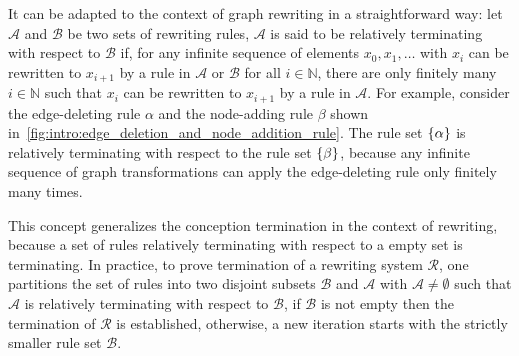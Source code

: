 It can be adapted to the context of graph rewriting in a straightforward way:
let \( \mathcal{A} \) and \( \mathcal{B} \) be two sets of rewriting rules, \( \mathcal{A} \) is said to be relatively terminating with respect to $\mathcal{B}$ if, for any infinite sequence of elements \( x_0, x_1, \ldots \) with $x_i$ can be rewritten to $x_{i+1}$ by a rule in $\mathcal{A}$ or $\mathcal{B}$ for all \( i \in \mathbb{N} \), there are only finitely many \( i \in \mathbb{N} \) such that $x_i$ can be rewritten to $x_{i+1}$ by a rule in $\mathcal{A}$. For example, consider the edge-deleting rule $\alpha$ and the node-adding rule $\beta$ shown in~\autoref{fig:intro:edge_deletion_and_node_addition_rule}. The rule set $\{\alpha\}$ is relatively terminating with respect to the rule set $\{\beta\}$, because any infinite sequence of graph transformations can apply the edge-deleting rule only finitely many times.

This concept generalizes the conception termination in the context of rewriting, because a set of rules relatively terminating with respect to a empty set is terminating. In practice, to prove termination of a rewriting system $\mathcal{R}$, one partitions the set of rules into two disjoint subsets \( \mathcal{B} \) and \( \mathcal{A} \) with $\mathcal{A}\neq \emptyset$ such that \( \mathcal{A} \) is relatively terminating with respect to \( \mathcal{B} \), if $\mathcal{B}$ is not empty then the termination of $\mathcal{R}$ is established, otherwise, a new iteration starts with the strictly smaller rule set $\mathcal{B}$.


